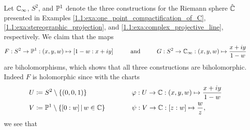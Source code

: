 \documentclass[../Moduli_Spaces_of_Riemann_Surfaces.tex]{subfiles}
\begin{document}
    \begin{example}\label{1.2:exa:biholomorphisms_between_Riemann_spheres}
        Let $\C_\infty$, $S^2$, and $\P^1$ denote the three constructions for the Riemann sphere $\RS$ presented in Examples \ref{1.1:exa:one_point_compactification_of_C}, \ref{1.1:exa:stereographic_projection}, and \ref{1.1:exa:complex_projective_line}, respectively. We claim that the maps
        \begin{equation*}
            F:S^2\to\P^1:\tpl{x,y,w}\mapsto\proje{1-w:x+iy}\ \ \ \ \ \ \ \ \textrm{and}\ \ \ \ \ \ \ \ G:S^2\to\C_\infty:\tpl{x,y,w}\mapsto\frac{x+iy}{1-w}
        \end{equation*}
        are biholomorphisms, which shows that all three constructions are biholomorphic. Indeed $F$ is holomorphic since with the charts
        \begin{equation*}
            \begin{alignedat}{2}
                U&\coloneqq S^2\comp\l\{\l(0,0,1\r)\r\}\ \ \ \ \ \ \ \ \ \ \ \ \ \ \ \ \ \ \ \ &&\phi:U\to\C:\tpl{x,y,w}\mapsto\frac{x+iy}{1-w} \\
                V&\coloneqq\P^1\comp\l\{\proje{0:w}\mid w\in\C\r\}&&\psi:V\to\C:\proje{z:w}\mapsto\frac{w}{z},
            \end{alignedat}
        \end{equation*}
        we see that
        \begin{equation*}

\end{equation*}
\end{example}
\end{document}
